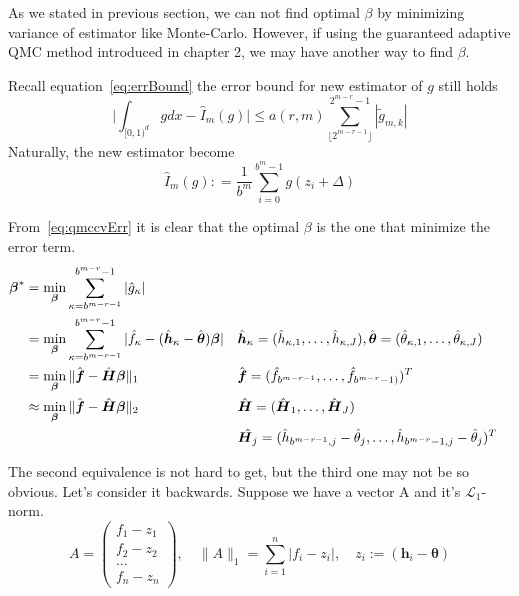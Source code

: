 
As we stated in previous section, we can not find optimal $\beta$ by minimizing variance of estimator like Monte-Carlo. 
However, if using the guaranteed adaptive QMC method introduced in chapter 2, we may have another way to find $\beta$.

Recall equation~\eqref{eq:errBound} the error bound for new estimator of $g$ still holds
\begin{equation}\label{eq:qmccvErr}
	\Big|\int_{[0,1)^d}gdx - \hat{I}_m(g)\Big| \leq a(r,m) \sum_{\lfloor 2^{m-r-1} \rfloor}^{2^{m-r}-1} |\tilde{g}_{m,k}|
\end{equation}
Naturally, the new estimator become
\begin{equation}\label{eq:estcv}
    \hat{I}_m({g}): = \frac{1}{b^m}\sum_{i=0}^{b^m-1}g(z_i+\Delta)
\end{equation}


From~\eqref{eq:qmccvErr} it is clear that the optimal $\beta$ is the one that minimize the error term. 
\begin{align}
    \label{eq:optbeta1}
    \boldsymbol{\beta}^*
    &=\min_{\boldsymbol{\beta}}\sum_{\kappa=b^{m-r-1}}^{b^{m-r}-1} |\hat{g}_{\kappa}|\\
    \label{eq:optbeta2}
    &=\min_{\boldsymbol{\beta}}\sum_{\kappa=b^{m-r-1}}^{b^{m-r}-1}|\hat{f}_\kappa
    -(\hat{\boldsymbol{h}}_\kappa - \hat{\boldsymbol{\theta}})\boldsymbol{\boldsymbol{\beta}}|
    && \hat{\boldsymbol{h}}_\kappa=(\hat{h}_{\kappa,1},\dots, \hat{h}_{\kappa,J}),
    \hat{\boldsymbol{\theta}}=(\hat{\theta}_{\kappa,1},\dots,\hat{\theta}_{\kappa,J})\\
    \label{eq:optbeta3}
    &=\min_{\boldsymbol{\beta}}\|\hat{\boldsymbol{f}}-\hat{\boldsymbol{H}}\boldsymbol{\beta}\|_1
    && \hat{\boldsymbol{f}}= (\hat{f}_{b^{m-r-1}},\dots,\hat{f}_{b^{m-r}-1)})^T \\
    \label{eq:optbeta4}
    &\approx\min_{\boldsymbol{\beta}}\|\hat{\boldsymbol{f}}-\hat{\boldsymbol{H}}\boldsymbol{\beta}\|_2
    && \hat{\boldsymbol{H}}= (\hat{\boldsymbol{H}}_1, \dots, \hat{\boldsymbol{H}}_J)\\
    & \notag 
    &&\hat{\boldsymbol{H}_j}=(\hat{h}_{b^{m-r-1},j}-\hat{\theta}_j,\dots, \hat{h}_{b^{m-r}-1,j}-\hat{\theta}_j)^T
\end{align}

The second equivalence is not hard to get, but the third one may not be so obvious. Let's consider it backwards. Suppose we have a vector A and it's $\mathcal{L}_1$-norm.
\[
   A=
    \begin{pmatrix}
        f_1-z_1\\
        f_2-z_2\\
        \hdots\\
        f_n-z_n
    \end{pmatrix},\quad
    \|A\|_1=\sum_{i=1}^{n}|f_i-z_i|, \quad
    z_i:=(\boldsymbol{h}_i-\boldsymbol{\theta})
\]

